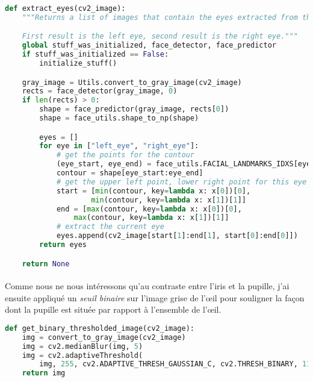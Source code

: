 \begin{lstlisting}[language=Python, caption=Extraire les yeux]
def extract_eyes(cv2_image):
    """Returns a list of images that contain the eyes extracted from the original image.

    First result is the left eye, second result is the right eye."""
    global stuff_was_initialized, face_detector, face_predictor
    if stuff_was_initialized == False:
        initialize_stuff()

    gray_image = Utils.convert_to_gray_image(cv2_image)
    rects = face_detector(gray_image, 0)
    if len(rects) > 0:
        shape = face_predictor(gray_image, rects[0])
        shape = face_utils.shape_to_np(shape)

        eyes = []
        for eye in ["left_eye", "right_eye"]:
            # get the points for the contour
            (eye_start, eye_end) = face_utils.FACIAL_LANDMARKS_IDXS[eye]
            contour = shape[eye_start:eye_end]
            # get the upper left point, lower right point for this eye
            start = [min(contour, key=lambda x: x[0])[0],
                    min(contour, key=lambda x: x[1])[1]]
            end = [max(contour, key=lambda x: x[0])[0],
                max(contour, key=lambda x: x[1])[1]]
            # extract the current eye
            eyes.append(cv2_image[start[1]:end[1], start[0]:end[0]])
        return eyes

    return None
\end{lstlisting}

\clearpage
\paragraph{}
Comme nous ne nous intéressons qu'au contraste entre l'iris et la pupille, j'ai ensuite appliqué un \emph{seuil binaire} sur l'image grise de l'œil pour souligner la façon dont la pupille est située par rapport à l'ensemble de l'œil.

\begin{lstlisting}[language=Python, caption=Application d'un seuil binaire]
def get_binary_thresholded_image(cv2_image):
    img = convert_to_gray_image(cv2_image)
    img = cv2.medianBlur(img, 5)
    img = cv2.adaptiveThreshold(
        img, 255, cv2.ADAPTIVE_THRESH_GAUSSIAN_C, cv2.THRESH_BINARY, 11, 2)
    return img
\end{lstlisting}

